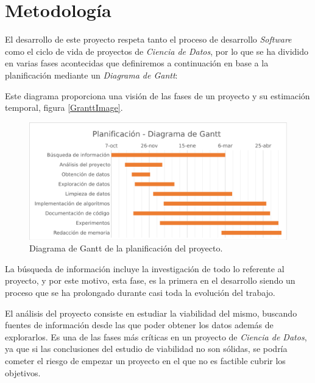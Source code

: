 
\chapter{Metodología}
\label{metodologia}

El desarrollo de este proyecto respeta tanto el proceso de desarrollo \textit{Software} como el ciclo de vida de proyectos de \textit{Ciencia de Datos}, por lo que se ha dividido en varias fases acontecidas que definiremos a continuación en base a la planificación mediante un \textit{Diagrama de Gantt}:

Este diagrama proporciona una visión de las fases de un proyecto y su estimación temporal, figura \eqref{GranttImage}.

\begin{figure}[H]
    \centering
    \includegraphics[width=15cm]{archivos/4.Metodologia/GranttImage}
    \caption{Diagrama de Gantt de la planificación del proyecto.}
    \label{GranttImage}
\end{figure}

La búsqueda de información incluye la investigación de todo lo referente al proyecto, y por este motivo, esta fase, es la primera en el desarrollo siendo un proceso que se ha prolongado durante casi toda la evolución del trabajo.

El análisis del proyecto consiste en estudiar la viabilidad del mismo, buscando fuentes de información desde las que poder obtener los datos además de explorarlos. Es una de las fases más críticas en un proyecto de \textit{Ciencia de Datos}, ya que si las conclusiones del estudio de viabilidad no son sólidas, se podría cometer el riesgo de empezar un proyecto en el que no es factible cubrir los objetivos.

